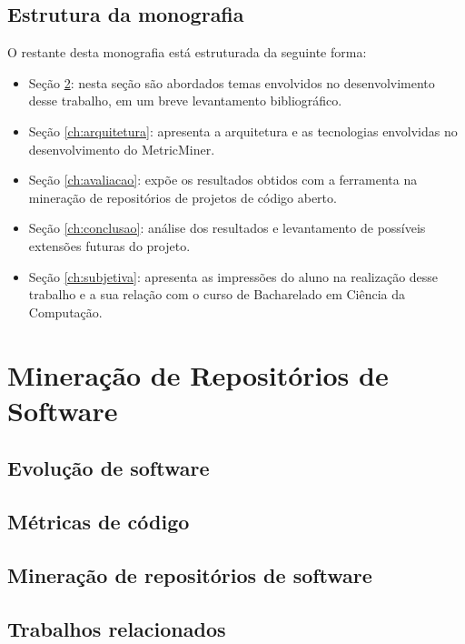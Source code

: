 \documentclass[a4paper, 12pt, twoside]{book}
\begin{document}
    \section{Estrutura da monografia}
        O restante desta monografia está estruturada da seguinte forma: 
        \begin{itemize}
            \item Seção \ref{ch:conceitos}: nesta seção são abordados temas 
                envolvidos no desenvolvimento desse trabalho, em um breve levantamento bibliográfico.
            \item Seção \ref{ch:arquitetura}: apresenta a arquitetura e as tecnologias
            envolvidas no desenvolvimento do MetricMiner.
            \item Seção \ref{ch:avaliacao}: expõe os resultados obtidos com a ferramenta 
                na mineração de repositórios de projetos de código aberto.
            \item Seção \ref{ch:conclusao}: análise dos resultados e levantamento 
                de possíveis extensões futuras do projeto.
            \item Seção \ref{ch:subjetiva}: apresenta as impressões do aluno na realização 
                desse trabalho e a sua relação com o curso de Bacharelado em Ciência da Computação.
        \end{itemize}
    
\chapter{Mineração de Repositórios de Software} \label{ch:conceitos}

    \section{Evolução de software}
    
    \section{Métricas de código}
    
    \section{Mineração de repositórios de software}

    \section{Trabalhos relacionados}
    
\end{document}
